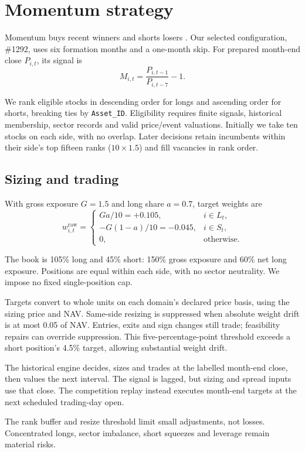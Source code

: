 \section{Momentum strategy}
\label{sec:momentum}

Momentum buys recent winners and shorts losers \citep{jegadeeshtitman1993}.
Our selected configuration, \#1292, uses six formation months and a one-month
skip. For prepared month-end close $P_{i,t}$, its signal is
\begin{equation}
 M_{i,t}=\frac{P_{i,t-1}}{P_{i,t-7}}-1.
 \label{eq:momentum}
\end{equation}

We rank eligible stocks in descending order for longs and ascending order for
shorts, breaking ties by \texttt{Asset\_ID}. Eligibility requires finite signals,
historical membership, sector records and valid price/event valuations.
Initially we take ten stocks on each side, with no overlap. Later decisions
retain incumbents within their side's top fifteen ranks ($10\times1.5$) and
fill vacancies in rank order.

\subsection{Sizing and trading}

With gross exposure $G=1.5$ and long share $a=0.7$, target weights are
\begin{equation}
 w_{i,t}^{\mathrm{raw}}=
 \begin{cases}
   Ga/10=+0.105, & i\in L_t,\\
   -G(1-a)/10=-0.045, & i\in S_t,\\
   0, & \text{otherwise}.
 \end{cases}
 \label{eq:weights}
\end{equation}

The book is 105\% long and 45\% short: 150\% gross exposure and 60\% net long exposure.
Positions are equal within each side, with no sector neutrality.
We impose no fixed single-position cap.

Targets convert to whole units on each domain's declared price basis, using
the sizing price and NAV. Same-side resizing is suppressed when absolute
weight drift is at most 0.05 of NAV. Entries, exits and sign changes still
trade; feasibility repairs can override suppression. This five-percentage-point
threshold exceeds a short position's 4.5\% target, allowing substantial weight
drift.

The historical engine decides, sizes and trades at the labelled month-end
close, then values the next interval. The signal is lagged, but sizing and
spread inputs use that close. The competition replay instead executes
month-end targets at the next scheduled trading-day open.

The rank buffer and resize threshold limit small adjustments, not losses.
Concentrated longs, sector imbalance, short squeezes and leverage remain
material risks.
